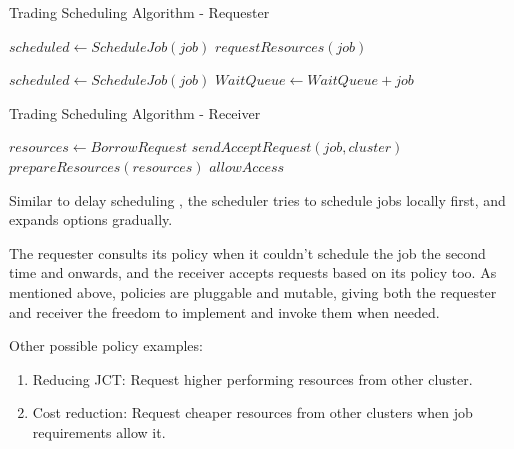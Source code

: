 \begin{algorithm}[H]
\caption{Trading Scheduling Algorithm - Requester}
\begin{algorithmic}
        \State $scheduled \gets ScheduleJob(job)$
        \State $requestResources(job)$
        \EndIf
    \EndFor

        \State $scheduled \gets ScheduleJob(job)$
        \State $WaitQueue \gets WaitQueue + job$
        \EndIf
    \EndFor
\end{algorithmic}
\end{algorithm}

\begin{algorithm}[H]
    \caption{Trading Scheduling Algorithm - Receiver}
    \begin{algorithmic}
            \State $ resources \gets BorrowRequest $  
            \State $sendAcceptRequest(job, cluster)$
            \State $prepareResources(resources)$
            \State $allowAccess$
            \EndIf
    \end{algorithmic}
\end{algorithm} 

Similar to delay scheduling \cite{zaharia_delay_2010}, the scheduler tries to schedule jobs locally first, and 
expands options gradually. 

The requester consults its policy when it couldn't schedule the job the second time and onwards, and the receiver 
accepts requests based on its policy too. As mentioned above, policies are pluggable and mutable, giving both the requester 
and receiver the freedom to implement and invoke them when needed.

Other possible policy examples:
\begin{enumerate}
    \item Reducing JCT: Request higher performing resources from other cluster. 
    \item Cost reduction: Request cheaper resources from other clusters when job requirements allow it. 
\end{enumerate}